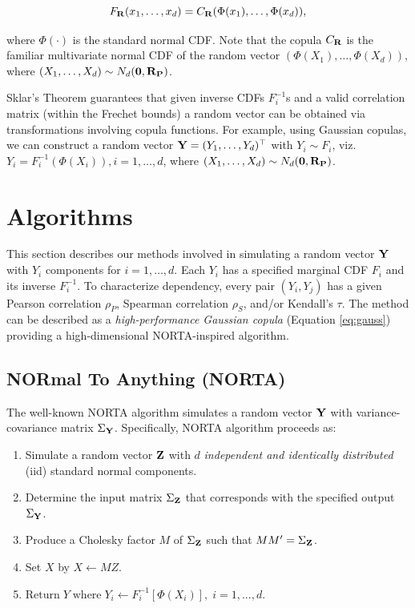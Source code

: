 \documentclass[
]{jss}
\providecommand{\tightlist}{%
  \setlength{\itemsep}{0pt}\setlength{\parskip}{0pt}}
\begin{document}
\begin{equation}
\label{eq:gauss}
F_{{\bf R}}(x_1, \ldots, x_d) = C_{{\bf R}}(\Phi(x_1), \ldots, \Phi(x_d)),
\end{equation}

where \(\Phi(\cdot)\) is the standard normal CDF. Note that the copula \(C_{{\bf R}}\) is the familiar multivariate normal CDF of the random vector \((\Phi(X_1), \ldots, \Phi(X_d))\), where \((X_1, \ldots, X_d) \sim N_d({\bf 0}, {\bf R_P})\).

Sklar's Theorem \citep{Sklar1959, Ubeda-Flores2017} guarantees that given inverse CDFs \(F_i^{-1}\)s and a valid correlation matrix (within the Frechet bounds) a random vector can be obtained via transformations involving copula functions. For example, using Gaussian copulas, we can construct a random vector \({\bf Y} = (Y_1, \ldots, Y_d)^\top\) with \(Y_i \sim F_i\), viz.~\(Y_i = F_i^{-1}(\Phi(X_i)), i=1, \ldots, d\), where \((X_1, \ldots, X_d) \sim N_d({\bf 0}, {\bf R_P})\).

\hypertarget{algorithms}{%
\section{Algorithms}\label{algorithms}}

This section describes our methods involved in simulating a random vector \(\bf Y\) with \(Y_i\) components for \(i=1,\ldots,d\). Each \(Y_i\) has a specified marginal CDF \(F_i\) and its inverse \(F^{-1}_i\). To characterize dependency, every pair \((Y_i, Y_j)\) has a given Pearson correlation \(\rho_P\), Spearman correlation \(\rho_S\), and/or Kendall's \(\tau\). The method can be described as a \emph{high-performance Gaussian copula} (Equation \eqref{eq:gauss}) providing a high-dimensional NORTA-inspired algorithm.

\hypertarget{normal-to-anything-norta}{%
\subsection{NORmal To Anything (NORTA)}\label{normal-to-anything-norta}}

The well-known NORTA algorithm \citep{Cario1997} simulates a random vector \(\bf Y\) with variance-covariance matrix \(\Sigma_{\bf Y}\). Specifically, NORTA algorithm proceeds as:


\begin{enumerate}
\def\labelenumi{\arabic{enumi}.}
\tightlist
\item
  Simulate a random vector \(\bf Z\) with \(d\) \emph{independent and identically distributed} (iid) standard normal components.
\item
  Determine the input matrix \(\Sigma_{\bf Z}\) that corresponds with the specified output \(\Sigma_{\bf Y}\).
\item
  Produce a Cholesky factor \(M\) of \(\Sigma_{\bf Z}\) such that \(M M^{\prime}=\Sigma_{\bf Z}\).
\item
  Set \(X\) by \(X \gets MZ\).
\item
  \(\text{Return} \; Y \; \text{where} \; Y_i \gets F_i^{-1}[\Phi(X_i)], \; i=1,...,d\).
\end{enumerate}
\end{document}
